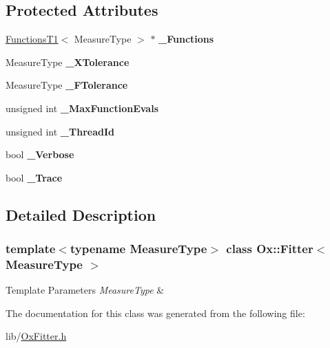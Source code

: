 \subsection*{Protected Attributes}
\begin{DoxyCompactItemize}
\item 
\mbox{\label{class_ox_1_1_fitter_a1d3132ba589ae8f5d73ac61069572f2b}} 
\mbox{\hyperlink{class_ox_1_1_functions_t1}{Functions\+T1}}$<$ Measure\+Type $>$ $\ast$ {\bfseries \+\_\+\+Functions}
\item 
\mbox{\label{class_ox_1_1_fitter_af91a5ea8fb20072277ddcd64f5537b09}} 
Measure\+Type {\bfseries \+\_\+\+X\+Tolerance}
\item 
\mbox{\label{class_ox_1_1_fitter_a926f6cf38998f041c31b079e93bf27ab}} 
Measure\+Type {\bfseries \+\_\+\+F\+Tolerance}
\item 
\mbox{\label{class_ox_1_1_fitter_a3be7ea1c1f19d3f4fb384474e2b1a033}} 
unsigned int {\bfseries \+\_\+\+Max\+Function\+Evals}
\item 
\mbox{\label{class_ox_1_1_fitter_a0d97d7a9c9fad0349484151464fefe4f}} 
unsigned int {\bfseries \+\_\+\+Thread\+Id}
\item 
\mbox{\label{class_ox_1_1_fitter_a6457339f5252c85d7c92f20439544975}} 
bool {\bfseries \+\_\+\+Verbose}
\item 
\mbox{\label{class_ox_1_1_fitter_a9ba79cb05ecc670254b3e7ddafc519ab}} 
bool {\bfseries \+\_\+\+Trace}
\end{DoxyCompactItemize}


\subsection{Detailed Description}
\subsubsection*{template$<$typename Measure\+Type$>$\newline
class Ox\+::\+Fitter$<$ Measure\+Type $>$}


\begin{DoxyTemplParams}{Template Parameters}
{\em Measure\+Type} & \\
\hline
\end{DoxyTemplParams}


The documentation for this class was generated from the following file\+:\begin{DoxyCompactItemize}
\item 
lib/\mbox{\hyperlink{_ox_fitter_8h}{Ox\+Fitter.\+h}}\end{DoxyCompactItemize}
